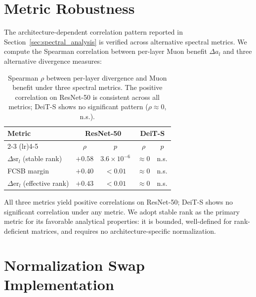 \section{Metric Robustness}\label{sec:metric_robustness}

The architecture-dependent correlation pattern reported in Section~\ref{sec:spectral_analysis} is verified across alternative spectral metrics. We compute the Spearman correlation between per-layer Muon benefit $\Delta a_l$ and three alternative divergence measures:

\begin{table}[h]
\centering
\caption{Spearman $\rho$ between per-layer divergence and Muon benefit under three spectral metrics. The positive correlation on ResNet-50 is consistent across all metrics; DeiT-S shows no significant pattern ($\rho \approx 0$, n.s.).}
\label{tab:metric_robustness}
\small
\begin{tabular}{@{}lcccc@{}}
\toprule
Metric & \multicolumn{2}{c}{ResNet-50} & \multicolumn{2}{c}{DeiT-S} \\
\cmidrule(lr){2-3} \cmidrule(lr){4-5}
 & $\rho$ & $p$ & $\rho$ & $p$ \\
\midrule
$\Delta\mathrm{sr}_l$ (stable rank) & $+0.58$ & $3.6{\times}10^{-6}$ & $\approx 0$ & n.s. \\
FCSB margin & $+0.40$ & ${<}0.01$ & $\approx 0$ & n.s. \\
$\Delta\mathrm{er}_l$ (effective rank) & $+0.43$ & ${<}0.01$ & $\approx 0$ & n.s. \\
\bottomrule
\end{tabular}
\end{table}

All three metrics yield positive correlations on ResNet-50; DeiT-S shows no significant correlation under any metric.
We adopt stable rank as the primary metric for its favorable analytical properties: it is bounded, well-defined for rank-deficient matrices, and requires no architecture-specific normalization.

\section{Normalization Swap Implementation}\label{sec:normswap_details}

